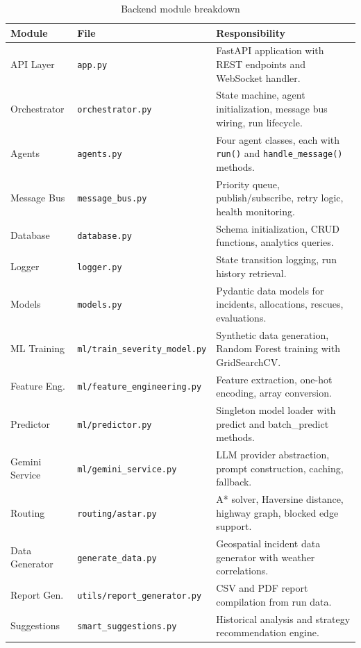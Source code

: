\begin{table}[H]
\centering
\caption{Backend module breakdown}
\label{tab:module_design}
\begin{tabularx}{\textwidth}{|l|l|X|}
\hline
\textbf{Module} & \textbf{File} & \textbf{Responsibility} \\
\hline
API Layer & \texttt{app.py} & FastAPI application with REST endpoints and WebSocket handler. \\
\hline
Orchestrator & \texttt{orchestrator.py} & State machine, agent initialization, message bus wiring, run lifecycle. \\
\hline
Agents & \texttt{agents.py} & Four agent classes, each with \texttt{run()} and \texttt{handle\_message()} methods. \\
\hline
Message Bus & \texttt{message\_bus.py} & Priority queue, publish/subscribe, retry logic, health monitoring. \\
\hline
Database & \texttt{database.py} & Schema initialization, CRUD functions, analytics queries. \\
\hline
Logger & \texttt{logger.py} & State transition logging, run history retrieval. \\
\hline
Models & \texttt{models.py} & Pydantic data models for incidents, allocations, rescues, evaluations. \\
\hline
ML Training & \texttt{ml/train\_severity\_model.py} & Synthetic data generation, Random Forest training with GridSearchCV. \\
\hline
Feature Eng. & \texttt{ml/feature\_engineering.py} & Feature extraction, one-hot encoding, array conversion. \\
\hline
Predictor & \texttt{ml/predictor.py} & Singleton model loader with predict and batch\_predict methods. \\
\hline
Gemini Service & \texttt{ml/gemini\_service.py} & LLM provider abstraction, prompt construction, caching, fallback. \\
\hline
Routing & \texttt{routing/astar.py} & A* solver, Haversine distance, highway graph, blocked edge support. \\
\hline
Data Generator & \texttt{generate\_data.py} & Geospatial incident data generator with weather correlations. \\
\hline
Report Gen. & \texttt{utils/report\_generator.py} & CSV and PDF report compilation from run data. \\
\hline
Suggestions & \texttt{smart\_suggestions.py} & Historical analysis and strategy recommendation engine. \\
\hline
\end{tabularx}
\end{table}

